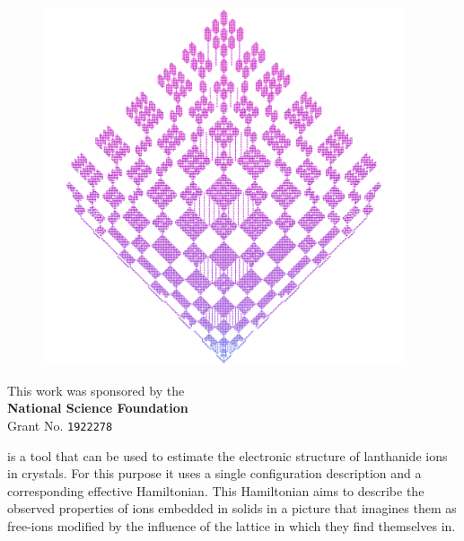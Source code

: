 \documentclass{article}
\newcommand{\codetext}[1]{{\color{BlueViolet} \texttt{#1}}}
\begin{document}
\begin{center}
\vspace{-0.27cm}
\begin{figure}[h!]
	\begin{center}
		\includegraphics[width=0.95\textwidth]{nd_code.png}
	\end{center}
\end{figure}
\vspace{-0.7cm}
This work was sponsored by the \\ \textbf{National Science Foundation} \\ Grant No. \codetext{1922278}
\end{center}


\vspace*{\fill}

\cleardoublepage


\vspace*{\fill}

\qlanth is a tool that can be used to estimate the electronic structure of lanthanide ions in crystals. For this purpose it uses a single configuration description and a corresponding effective Hamiltonian. This Hamiltonian aims to describe the observed properties of ions embedded in solids in a picture that imagines them as free-ions modified by the influence of the lattice in which they find themselves in.
\end{document}
